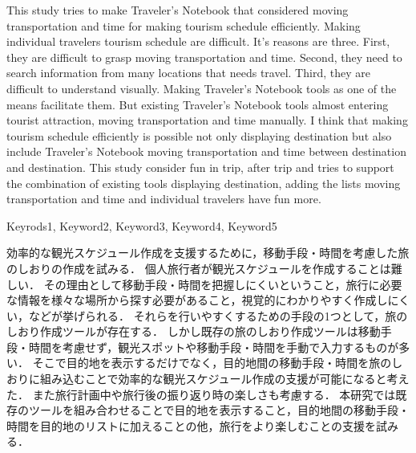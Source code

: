 \documentclass{funthesis}
\begin{document}
\maketitle       %

\begin{eabstract}
This study tries to make Traveler's Notebook that considered moving transportation and time for making tourism schedule efficiently.
Making individual travelers tourism schedule are difficult.
It's reasons are three. First, they are difficult to grasp moving transportation and time. Second, they need to search information from many locations that needs travel. Third,  they are difficult to understand visually.
Making Traveler's Notebook tools as one of the means facilitate them.
But existing Traveler's Notebook tools almost entering tourist attraction, moving transportation and time manually.
I think that making tourism schedule efficiently is possible not only displaying destination but also include Traveler's Notebook moving transportation and time between destination and destination.
This study consider fun in trip, after trip 
and tries to support the combination of existing tools displaying destination, adding the lists moving transportation and time and individual travelers have fun more.

\end{eabstract}

\begin{ekeyword}
Keyrods1, Keyword2, Keyword3, Keyword4, Keyword5
\end{ekeyword}

\begin{jabstract}
効率的な観光スケジュール作成を支援するために，移動手段・時間を考慮した旅のしおりの作成を試みる．
個人旅行者が観光スケジュールを作成することは難しい．
その理由として移動手段・時間を把握しにくいということ，旅行に必要な情報を様々な場所から探す必要があること，視覚的にわかりやすく作成しにくい，などが挙げられる．
それらを行いやすくするための手段の1つとして，旅のしおり作成ツールが存在する．
しかし既存の旅のしおり作成ツールは移動手段・時間を考慮せず，観光スポットや移動手段・時間を手動で入力するものが多い．
そこで目的地を表示するだけでなく，目的地間の移動手段・時間を旅のしおりに組み込むことで効率的な観光スケジュール作成の支援が可能になると考えた．
また旅行計画中や旅行後の振り返り時の楽しさも考慮する．
本研究では既存のツールを組み合わせることで目的地を表示すること，目的地間の移動手段・時間を目的地のリストに加えることの他，旅行をより楽しむことの支援を試みる．

\end{jabstract}
\end{document}
